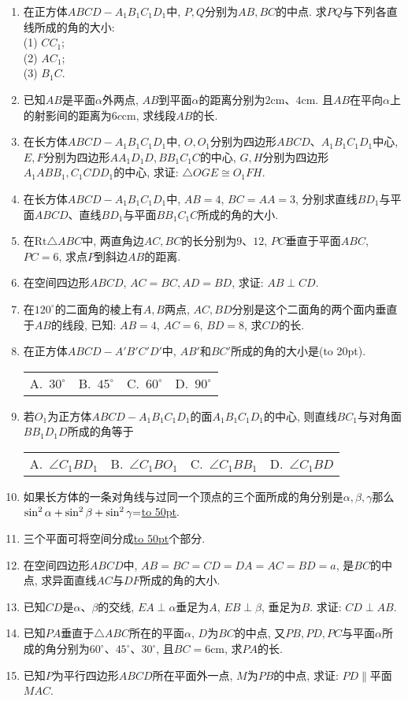\documentclass[10pt,a4paper]{article}
\newcommand{\blank}[1]{\underline{\hbox to #1pt{}}}
\newcommand{\bracket}[1]{(\hbox to #1pt{})}
\newcommand{\fourch}[4]{\par\begin{tabular}{p{.23\textwidth}p{.23\textwidth}p{.23\textwidth}p{.23\textwidth}}
A.~#1 &B.~#2& C.~#3& D.~#4
\end{tabular}}
\begin{document}
\begin{enumerate}[1.]
\item 在正方体$ABCD-A_1B_1C_1D_1$中, $P,Q$分别为$AB,BC$的中点. 求$PQ$与下列各直线所成的角的大小:\\
(1) $CC_1$;\\
(2) $AC_1$;\\
(3) $B_1C$.
\item 已知$AB$是平面$\alpha$外两点, $AB$到平面$\alpha$的距离分别为$2\text{cm}$、$4\text{cm}$. 且$AB$在平向$\alpha$上的射影间的距离为$6c\text{cm}$, 求线段$AB$的长.
\item 在长方体$ABCD-A_1B_1C_1D_1$中, $O,O_1$分别为四边形$ABCD$、$A_1B_1C_1D_1$中心, $E,F$分别为四边形$AA_1D_1D,BB_1C_1C$的中心, $G,H$分别为四边形$A_1ABB_1,C_1CDD_1$的中心, 求证: $\triangle OGE\cong O_1FH$.
\item 在长方体$ABCD-A_1B_1C_1D_1$中, $AB=4$, $BC=AA=3$, 分别求直线$BD_1$与平面$ABCD$、直线$BD_1$与平面$BB_1C_1C$所成的角的大小.
\item 在$\text{Rt}\triangle ABC$中, 两直角边$AC,BC$的长分别为$9$、$12$, $PC$垂直于平面$ABC$, $PC=6$, 求点$P$到斜边$AB$的距离.
\item 在空间四边形$ABCD$, $AC=BC,AD=BD$, 求证: $AB\perp CD$.
\item 在$120^\circ$的二面角的棱上有$A,B$两点, $AC,BD$分别是这个二面角的两个面内垂直于$AB$的线段, 已知: $AB=4$, $AC=6$, $BD=8$, 求$CD$的长.
\item 在正方体$ABCD-A'B'C'D'$中, $AB'$和$BC'$所成的角的大小是\bracket{20}.
\fourch{$30^\circ$}{$45^\circ$}{$60^\circ$}{$90^\circ$}
\item 若$O_1$为正方体$ABCD-A_1B_1C_1D_1$的面$A_1B_1C_1D_1$的中心, 则直线$BC_1$与对角面$BB_1D_1D$所成的角等于
\fourch{$\angle C_1BD_1$}{$\angle C_1BO_1$ }{$\angle C_1BB_1$ }{$\angle C_1BD$}
\item 如果长方体的一条对角线与过同一个顶点的三个面所成的角分别是$\alpha,\beta,\gamma$那么$\sin ^2\alpha +\sin ^2\beta +\sin ^2\gamma \text=$\blank{50}.
\item 三个平面可将空间分成\blank{50}个部分.
\item 在空间四边形$ABCD$中, $AB=BC=CD=DA=AC=BD=a$, 是$BC$的中点, 求异面直线$AC$与$DF$所成的角的大小.
\item 已知$CD$是$\alpha$、$\beta$的交线, $EA\perp \alpha$垂足为$A$, $EB\perp \beta$, 垂足为$B$. 求证: $CD\perp AB$.
\item 已知$PA$垂直于$\triangle ABC$所在的平面$\alpha$, $D$为$BC$的中点, 又$PB,PD,PC$与平面$\alpha$所成的角分别为$60^\circ$、$45^\circ$、$30^\circ$, 且$BC=6\text{cm}$, 求$PA$的长.
\item 已知$P$为平行四边形$ABCD$所在平面外一点, $M$为$PB$的中点, 求证: $PD\parallel$平面$MAC$.

\end{enumerate}
\end{document}
